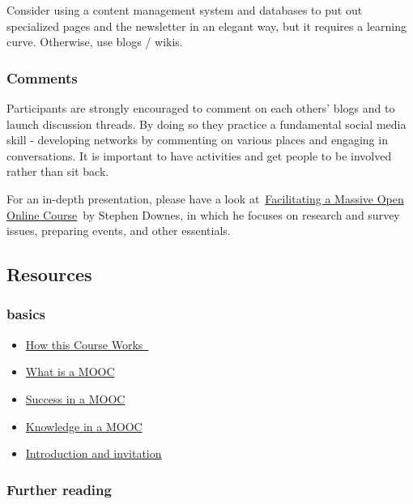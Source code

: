 Consider using a content management system and databases to put out
specialized pages and the newsletter in an elegant way, but it requires
a learning curve. Otherwise, use blogs / wikis.

\subsubsection{Comments}

Participants are strongly encouraged to comment on each others' blogs
and to launch discussion threads. By doing so they practice a
fundamental social media skill - developing networks by commenting on
various places and engaging in conversations. It is important to have
activities and get people to be involved rather than sit back.

For an in-depth presentation, please have a look
at~\href{http://www.downes.ca/presentation/290}{Facilitating a Massive
Open Online Course}~by Stephen Downes, in which he focuses on research
and survey issues, preparing events, and other essentials.

\subsection{Resources}

\subsubsection{basics}

\begin{itemize}
\item
  \href{http://change.mooc.ca/how.htm}{How this Course Works~}
\item
  \href{http://www.youtube.com/watch?v=eW3gMGqcZQc}{What is a MOOC}
\item
  \href{http://www.youtube.com/watch?v=r8avYQ5ZqM0}{Success in a MOOC}
\item
  \href{http://www.youtube.com/watch?v=bWKdhzSAAG0}{Knowledge in a MOOC}
\item
  \href{http://www.youtube.com/watch?v=mqnyhLfNH3I}{Introduction and
  invitation}
\end{itemize}

\subsubsection{Further reading}

